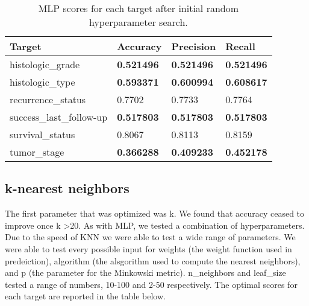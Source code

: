 \documentclass{article}
\begin{document}
\medskip
\begin{table}[H]
\begin{center}
\begin{tabular}{ *{4}{l} }
    \multicolumn{1}{p{1.5cm}}{\raggedright Target} &  
    \multicolumn{1}{p{1.5cm}}{\raggedright Accuracy} &  
    \multicolumn{1}{p{1.5cm}}{\raggedright Precision} &  
    \multicolumn{1}{p{1.5cm}}{\raggedright Recall} \\ \hline
histologic\_grade       &       \textbf{0.521496} &        \textbf{0.521496} &     \textbf{0.521496} \\
histologic\_type        &       \textbf{0.593371} &        \textbf{0.600994} &     \textbf{0.608617} \\
recurrence\_status      &         0.7702 &          0.7733 &       0.7764 \\
success\_last\_follow-up &       \textbf{0.517803} &        \textbf{0.517803} &     \textbf{0.517803} \\
survival\_status        &         0.8067 &          0.8113 &       0.8159 \\
tumor\_stage            &       \textbf{0.366288} &        \textbf{0.409233} &     \textbf{0.452178} \\
\end{tabular}
\caption{MLP scores for each target after initial random hyperparameter search.}
\end{center}
\end{table}

\subsection{k-nearest neighbors}

The first parameter that was optimized was k. We found that accuracy ceased to improve once k \textgreater  20. 
As with MLP, we tested a combination of hyperparameters. 
Due to the speed of KNN we were able to test a wide range of parameters. We were able to test every possible input for weights (the weight function used in predeiction), algorithm (the alsgorithm used to compute the nearest neighbors), and p (the parameter for the Minkowski metric). 
n\_neighbors and leaf\_size tested a range of numbers, 10-100 and 2-50 respectively.
The optimal scores for each target are reported in the table below.
\end{document}
